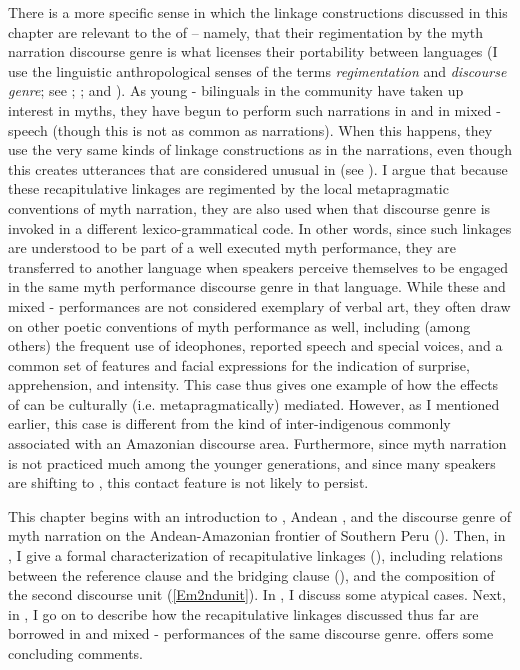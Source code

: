 \documentclass[output=paper]{LSP/langsci}
\begin{document}
There is a more specific sense in which the  linkage constructions discussed in this chapter are relevant to the  of  – namely, that their regimentation by the myth narration discourse genre is what licenses their portability between languages (I use the linguistic anthropological senses of the terms \textit{regimentation} and \textit{discourse genre}; see \citealt{briggs.1992}; \citealt{silverstein93}; and ). As young - bilinguals in the community have taken up interest in myths, they have begun to perform such narrations in  and in mixed - speech (though this is not as common as  narrations). When this happens, they use the very same kinds of linkage constructions as in the  narrations, even though this creates utterances that are considered unusual in  (see ). I argue that because these recapitulative linkages are regimented by the local metapragmatic conventions of myth narration, they are also used when that discourse genre is invoked in a different lexico-grammatical code. In other words, since such linkages are understood to be part of a well executed myth performance, they are transferred to another language when speakers perceive themselves to be engaged in the same myth performance discourse genre in that language. While these  and mixed - performances are not considered exemplary of  verbal art, they often draw on other poetic conventions of  myth performance as well, including (among others) the frequent use of ideophones, reported speech and special voices, and a common set of  features and facial expressions for the indication of surprise, apprehension, and intensity. This case thus gives one example of how the effects of  can be culturally (i.e. metapragmatically) mediated. However, as I mentioned earlier, this case is different from the kind of inter-indigenous  commonly associated with an Amazonian discourse area. Furthermore, since myth narration is not practiced much among the younger generations, and since many  speakers are shifting to , this contact feature is not likely to persist.
 
This chapter begins with an introduction to , Andean , and the discourse genre of myth narration on the Andean-Amazonian frontier of Southern Peru (). Then, in , I give a formal characterization of recapitulative linkages (), including relations between the reference clause and the bridging clause (), and the composition of the second discourse unit (\ref{Em2ndunit}). In , I discuss some atypical cases. Next, in , I go on to describe how the  recapitulative linkages discussed thus far are borrowed in  and mixed - performances of the same discourse genre.  offers some concluding comments.
%
\end{document}

